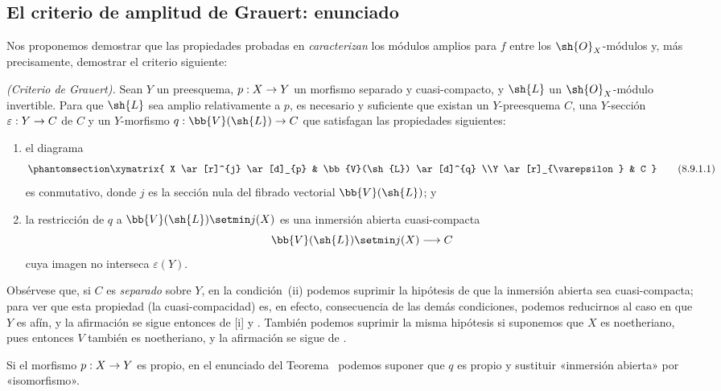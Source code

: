 \documentclass[oneside,10pt]{amsart}
\makeatletter
\newcommand{\ega@arrow}[2]{\mathchoice{#1}{#2}{#2}{#2}}
\renewcommand{\to}{\ega@arrow{\longrightarrow}{\rightarrow}}
\newcommand{\oldpage}[2][]{\marginnote{\normalfont\footnotesize\textbf{#1}~|~#2}\ignorespaces}
\let\EGAOriginalLabel\label
\renewcommand{\label}[1]{\phantomsection\EGAOriginalLabel{#1}}
\makeatother
\begin{document}
\subsection{El criterio de amplitud de Grauert: enunciado}
\label{subsection:II.8.9}

Nos proponemos demostrar que las propiedades probadas en  \emph{caracterizan} los módulos amplios para $f$ entre los $\sh{O}_X$-módulos y, más precisamente, demostrar el criterio siguiente:
\begin{theorem}[8.9.1]
\label{II.8.9.1}
\emph{(Criterio de Grauert).}
Sean $Y$ un preesquema, $p:X\to Y$ un morfismo separado y cuasi-compacto, y $\sh{L}$ un $\sh{O}_X$-módulo invertible.
Para que $\sh{L}$ sea amplio relativamente a $p$, es necesario y suficiente que existan un $Y$-preesquema $C$, una $Y$-sección $\varepsilon:Y\to C$ de $C$ y un $Y$-morfismo $q:\bb{V}(\sh{L})\to C$ que satisfagan las propiedades siguientes:
\begin{enumerate}
  \item[\rm{(i)}] el diagrama
    \[
      \label{II.8.9.1.1}
        \xymatrix{
          X
            \ar[r]^{j}
            \ar[d]_{p}
        & \bb{V}(\sh{L})
            \ar[d]^{q}
        \\Y
            \ar[r]_{\varepsilon}
        & C
        }
      \tag{8.9.1.1}
    \]
    es conmutativo, donde $j$ es la sección nula del fibrado vectorial $\bb{V}(\sh{L})$; y
  \item[\rm{(ii)}] la restricción de $q$ a $\bb{V}(\sh{L})\setmin j(X)$ es una inmersión abierta cuasi-compacta
    \[
      \bb{V}(\sh{L})\setmin j(X)\to C
    \]
    cuya imagen no interseca $\varepsilon(Y)$.
\end{enumerate}
\end{theorem}

Obsérvese que, si $C$ es \emph{separado} sobre $Y$, en la condición~(ii) podemos suprimir la hipótesis de que la inmersión abierta sea cuasi-compacta;
para ver que esta propiedad (la cuasi-compacidad) es, en efecto, consecuencia de las demás condiciones, podemos reducirnos al caso en que $Y$ es afín, y la afirmación se sigue entonces de [i] y .
También podemos suprimir
\oldpage[II]{183}
la misma hipótesis si suponemos que $X$ es noetheriano, pues entonces $V$ también es noetheriano, y la afirmación se sigue de .

\begin{corollary}[8.9.2]
\label{II.8.9.2}
Si el morfismo $p:X\to Y$ es propio, en el enunciado del Teorema~ podemos suponer que $q$ es propio y sustituir «inmersión abierta» por «isomorfismo».
\end{corollary}
\end{document}
